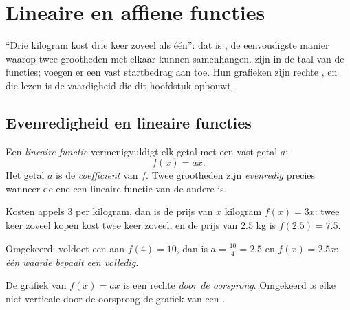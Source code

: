 \chapter{Lineaire en affiene functies}\label{ch:g9:linfunc}

``Drie kilogram kost drie keer zoveel als één'': dat is , de
eenvoudigste manier waarop twee grootheden met elkaar kunnen samenhangen.  zijn  in de taal van de functies;  voegen er
een vast startbedrag aan toe. Hun grafieken zijn rechte , en die  lezen
is de vaardigheid die dit hoofdstuk opbouwt.

\section{Evenredigheid en lineaire functies}

\begin{definition}\label{def:g9:linfunc:linear}
Een \emph{lineaire functie} vermenigvuldigt elk getal met
een vast getal $a$:
\[
f(x) = a x .
\]
Het getal $a$ is de \emph{coëfficiënt} van $f$. Twee grootheden zijn
\emph{evenredig} precies wanneer de ene een lineaire functie
van de andere is.
\end{definition}

\begin{example}\label{ex:g9:linfunc:linear}
Kosten appels $3$ per kilogram, dan is de prijs van $x$ kilogram $f(x) = 3x$:
twee keer zoveel kopen kost twee keer zoveel, en de prijs van $2.5$ kg is
$f(2.5) = 7.5$.

Omgekeerd: voldoet een  aan $f(4) = 10$, dan is
$a = \frac{10}{4} = 2.5$ en $f(x) = 2.5x$: \emph{één waarde bepaalt een  volledig.}
\end{example}

\begin{proposition}\label{prop:g9:linfunc:lineargraph}
De grafiek van $f(x) = ax$ is een rechte  \emph{door de oorsprong}. Omgekeerd
is elke niet-verticale  door de oorsprong de grafiek van een .
\end{proposition}
\admitted

